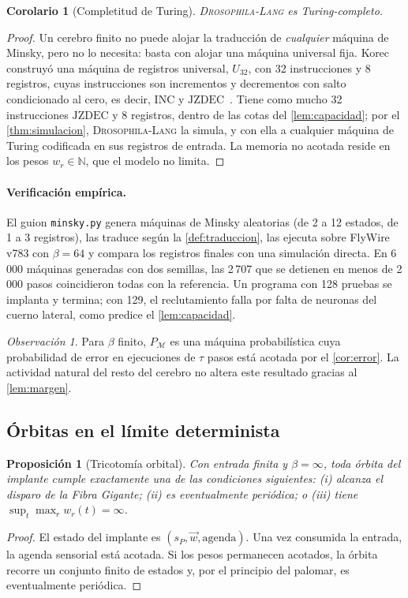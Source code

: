 \documentclass[11pt,a4paper]{article}
\theoremstyle{plain}
\newtheorem{proposicion}{Proposición}
\newtheorem{corolario}{Corolario}
\theoremstyle{definition}
\theoremstyle{remark}
\newtheorem{observacion}{Observación}
\newcommand{\dros}{\textup{\textsc{Drosophila-Lang}}}
\newcommand{\N}{\mathbb{N}}
\begin{document}
\begin{corolario}[Completitud de Turing]
\label{thm:turing}
\dros{} es Turing-completo.
\end{corolario}
\begin{proof}
Un cerebro finito no puede alojar la traducción de \emph{cualquier} máquina de
Minsky, pero no lo necesita: basta con alojar una máquina universal fija.
Korec construyó una máquina de registros universal, $U_{32}$, con 32
instrucciones y 8 registros, cuyas instrucciones son incrementos y
decrementos con salto condicionado al cero, es decir, $\mathrm{INC}$ y
$\mathrm{JZDEC}$~\cite{korec1996}. Tiene como mucho 32 instrucciones
$\mathrm{JZDEC}$ y 8 registros, dentro de las cotas del \cref{lem:capacidad};
por el \cref{thm:simulacion}, \dros{} la simula, y con ella a cualquier
máquina de Turing codificada en sus registros de entrada. La memoria no
acotada reside en los pesos $w_r\in\N$, que el modelo no limita.
\end{proof}

\paragraph{Verificación empírica.} El guion \texttt{minsky.py} genera
máquinas de Minsky aleatorias (de 2 a 12 estados, de 1 a 3 registros), las
traduce según la \cref{def:traduccion}, las ejecuta sobre FlyWire v783 con
$\beta=64$ y compara los registros finales con una simulación directa. En
6\,000 máquinas generadas con dos semillas, las 2\,707 que se detienen en
menos de 2\,000 pasos coincidieron todas con la referencia. Un programa con
128 pruebas se implanta y termina; con 129, el reclutamiento falla por falta
de neuronas del cuerno lateral, como predice el \cref{lem:capacidad}.

\begin{observacion}
Para $\beta$ finito, $P_{\mathcal M}$ es una máquina probabilística cuya
probabilidad de error en ejecuciones de $\tau$ pasos está acotada por el
\cref{cor:error}. La actividad natural del resto del cerebro no altera este
resultado gracias al \cref{lem:margen}.
\end{observacion}

\subsection{Órbitas en el límite determinista}

\begin{proposicion}[Tricotomía orbital]
\label{prop:tricotomia}
Con entrada finita y $\beta=\infty$, toda órbita del implante cumple
exactamente una de las condiciones siguientes: (i) alcanza el disparo de la
Fibra Gigante; (ii) es eventualmente periódica; o (iii) tiene
$\sup_t\max_r w_r(t)=\infty$.
\end{proposicion}
\begin{proof}
El estado del implante es $(s_P,\vec w,\text{agenda})$. Una vez consumida la
entrada, la agenda sensorial está acotada. Si los pesos permanecen acotados,
la órbita recorre un conjunto finito de estados y, por el principio del
palomar, es eventualmente periódica.
\end{proof}
\end{document}
